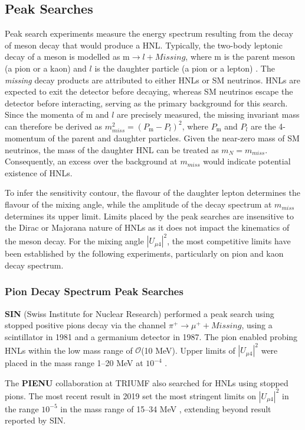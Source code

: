 \subsection{Peak Searches}

Peak search experiments measure the energy spectrum  resulting from the decay of meson decay that would produce a HNL. 
Typically, the two-body leptonic decay of a meson is modelled as $\text{m}\rightarrow l + Missing$, where $\text{m}$ is the parent meson (a pion or a kaon) and $l$ is the daughter particle (a pion or a lepton) \cite{OwenPhD}.
The \textit{missing} decay products are attributed to either HNLs or SM neutrinos.
HNLs are expected to exit the detector before decaying, whereas SM neutrinos escape the detector before interacting, serving as the primary background for this search.
Since the momenta of m and $l$ are precisely measured, the missing invariant mass can therefore be derived as $m^{2}_{miss} = (P_{\text{m}} - P_{l})^{2}$, where $P_{\text{m}}$ and $P_{l}$ are the 4-momentum of the parent and daughter particles.
Given the near-zero mass of SM neutrinos, the mass of the daughter HNL can be treated as $m_{N} = m_{miss}$.
Consequently, an excess over the background at $m_{miss}$ would indicate potential existence of HNLs.

To infer the sensitivity contour, the flavour of the daughter lepton determines the flavour of the mixing angle, while the amplitude of the decay spectrum at $m_{miss}$ determines its upper limit.
Limits placed by the peak searches are insensitive to the Dirac or Majorana nature of HNLs as it does not impact the kinematics of the meson decay.
For the mixing angle $|U_{\mu4}|^{2}$, the most competitive limits have been established by the following experiments, particularly on pion and kaon decay spectrum.

\subsubsection{Pion Decay Spectrum Peak Searches}

\begin{coloritemize}
\item \textbf{SIN} (Swiss Institute for Nuclear Research) performed a peak search using stopped positive pions decay via the channel $\pi^{+} \rightarrow \mu^{+} + Missing$, using a scintillator in 1981 and a germanium detector in 1987.
The pion enabled probing HNLs within the low mass range of $\mathcal{O}$(10 MeV).
Upper limits of $|U_{\mu4}|^{2}$ were placed in the mass range 1--20 MeV at $10^{-4}$ \cite{SIN1, SIN2, SIN3}.

\item The \textbf{PIENU} collaboration at TRIUMF also searched for HNLs using stopped pions.
The most recent result in 2019 set the most stringent limits on $|U_{\mu4}|^{2}$ in the range $10^{-5}$ in the mass range of 15--34 MeV \cite{PIENU}, extending beyond result reported by SIN.

\end{coloritemize}

